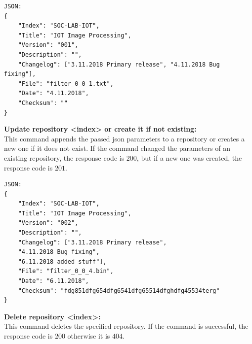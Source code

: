 \begin{verbatim}
JSON:
{
    "Index": "SOC-LAB-IOT",
    "Title": "IOT Image Processing",
    "Version": "001",
    "Description": "",
    "Changelog": ["3.11.2018 Primary release", "4.11.2018 Bug fixing"],
    "File": "filter_0_0_1.txt",
    "Date": "4.11.2018",
    "Checksum": ""
}	    
\end{verbatim}

\textbf{Update repository <index> or create it if not existing:}\\
This command appends the passed \gls{json} parameters to a repository or creates a new one if it does not exist. If the command changed the parameters of an existing repository, the response code is $200$, but if a new one was created, the response code is $201$.

\begin{table}[htbp]
    \centering
\end{table}

\begin{verbatim}
JSON:
{
    "Index": "SOC-LAB-IOT",
    "Title": "IOT Image Processing",
    "Version": "002",
    "Description": "",
    "Changelog": ["3.11.2018 Primary release", 
    "4.11.2018 Bug fixing", 
    "6.11.2018 added stuff"],
    "File": "filter_0_0_4.bin",
    "Date": "6.11.2018",
    "Checksum": "fdg851dfg654dfg6541dfg65514dfghdfg45534terg"
}	
\end{verbatim}

\textbf{Delete repository <index>:}\\
This command deletes the specified repository. If the command is successful, the response code is $200$ otherwise it is $404$.

\begin{table}[htbp]
    \centering
\end{table}

